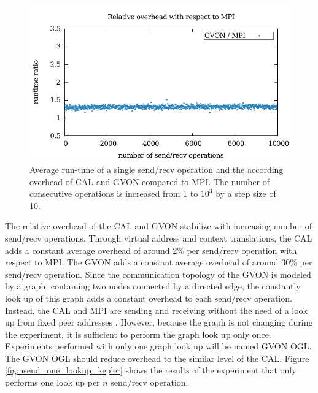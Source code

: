 \begin{figure}[H]
\begin{minipage}[t]{0.5\textwidth}
    \includegraphics[width=\textwidth]{plots/50_nsend_overhead_gvon}
  \end{minipage}%
  \caption{Average run-time of a single send/recv operation and the
    according overhead of CAL and GVON compared to MPI. The number of
    consecutive operations is increased from 1 to $10^3$ by a step
    size of 10. }
  \label{fig:nsend_kepler}
\end{figure}

\noindent The relative overhead of the CAL and GVON stabilize with
increasing number of send/recv operations.  Through virtual address
and context translations, the CAL adds a constant average overhead of
around 2\% per send/recv operation with respect to MPI. The GVON adds
a constant average overhead of around 30\% per send/recv operation.
Since the communication topology of the GVON is modeled by a graph,
containing two nodes connected by a directed edge, the constantly look
up of this graph adds a constant overhead to each send/recv operation.
Instead, the CAL and MPI are sending and receiving without the need of
a look up from fixed peer addresses .  However, because the graph is
not changing during the experiment, it is sufficient to perform the
graph look up only once. Experiments performed with only one graph
look up will be named GVON OGL. The GVON OGL should reduce overhead to
the similar level of the CAL. Figure \ref{fig:nsend_one_lookup_kepler}
shows the results of the experiment that only performs one look up per
$n$ send/recv operation.

